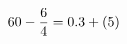 \documentclass[preview]{standalone}
\begin{document}
\begin{align*}
\special{dvisvgm:raw <g id='unique000'>}60 - \frac{6}{4} = 0.3 + (5)\special{dvisvgm:raw </g>}
\end{align*}
\end{document}
